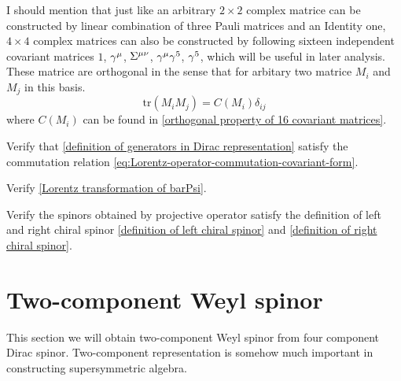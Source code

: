 I should mention that just like an arbitrary $2\times2$ complex matrice can be constructed by linear combination of three Pauli matrices and an Identity one, $4\times4$ complex matrices can also be constructed by following sixteen independent covariant matrices $1$, $\gamma^{\mu}$, $\Sigma^{\mu\nu}$, $\gamma^{\mu}\gamma^5$, $\gamma^5$, which will be useful in later analysis. These matrice are orthogonal in the sense that for arbitary two matrice $M_i$ and $M_j$ in this basis.  
\begin{equation}
\text{tr}(M_i M_j) = C(M_i)\delta_{ij}
\end{equation}
where $C(M_i)$ can be found in \eqref{orthogonal property of 16 covariant matrices}.


\begin{Exe}
Verify that \eqref{definition of generators in Dirac representation} satisfy the commutation relation \eqref{eq:Lorentz-operator-commutation-covariant-form}.
\end{Exe}
\begin{Exe}
Verify \eqref{Lorentz transformation of barPsi}.
\end{Exe}

\begin{Exe}
Verify the spinors obtained by projective operator satisfy the definition of left and right chiral spinor \eqref{definition of left chiral spinor} and
  \eqref{definition of right chiral spinor}.
\end{Exe}


\section{Two-component Weyl spinor}
This section we will obtain two-component Weyl spinor from four component Dirac spinor. Two-component representation is somehow much important in constructing supersymmetric algebra.

